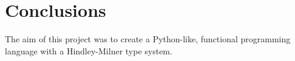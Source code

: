 \documentclass{l4proj}
\begin{document}
\chapter{Conclusions}    

        




The aim of this project was to create a Python-like, functional programming language with a Hindley-Milner type system.
\end{document}
